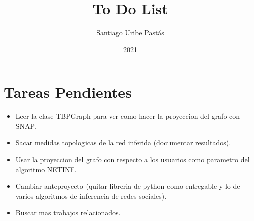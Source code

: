 \documentclass{article}
\title{To Do List}
\author{Santiago Uribe Pastás}
\date{2021}
\begin{document}
\maketitle

\section{Tareas Pendientes}
\begin{itemize}
    \item Leer la clase TBPGraph para ver como hacer la proyeccion del grafo con SNAP.
    \item Sacar medidas topologicas de la red inferida (documentar resultados).
    \item Usar la proyeccion del grafo con respecto a los usuarios como parametro del algoritmo NETINF.
    \item Cambiar anteproyecto (quitar libreria de python como entregable y lo de varios algoritmos de inferencia de redes sociales).
    \item Buscar mas trabajos relacionados.
\end{itemize}
\end{document}
